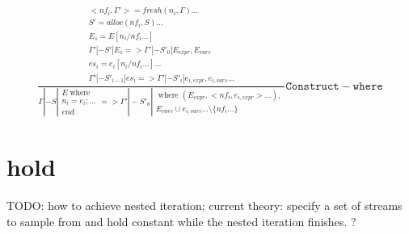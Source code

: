 \documentclass{scrartcl}
\DeclareMathOperator{\where}{where}
\begin{document}
    \begin{align*}
    \frac{
            \begin{matrix}
                <nf_i, \Gamma'> = fresh(n_i, \Gamma)... \\
                S' = alloc(nf_i, S)...\\
                E_s = E[n_i/nf_i...] \\
                \Gamma' |- S' | E_s => \Gamma' |- S'_0 | E_{expr}, E_{vars} \\
                es_i = e_i[n_i/nf_i...]... \\
                \Gamma' |- S'_{i-1} | es_i => \Gamma' |- S'_i | e_{i, expr}, e_{i,vars}...
            \end{matrix}
        }{
            \Gamma |- S \left| 
            \begin{array}{l}
                E \where \\
                n_i = e_i; ... \\ 
                end
            \end{array}
            \right. => \Gamma' |- S'_n \left| 
            \begin{matrix}
                \where(E_{expr}, <nf_i, e_{i, expr}>...), \\
                E_{vars} \cup e_{i,vars}... \setminus \{nf_i...\}
            \end{matrix}
            \right.
        }\mathtt{Construct-where}
    \end{align*}
    
    \section{hold}
    
    TODO: how to achieve nested iteration; current theory: specify a set of streams to sample
    from and hold constant while the nested iteration finishes. ?
    
\end{document}
